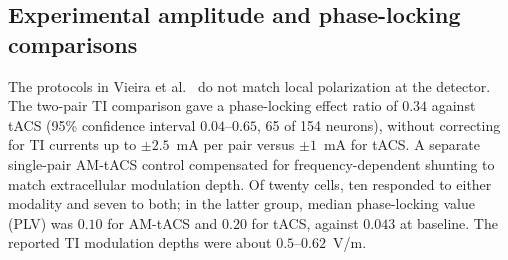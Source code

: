 \subsection{Experimental amplitude and phase-locking comparisons}\label{supp:vieira}
The protocols in Vieira et al.\ \cite{vieira2024} do not match local polarization at the detector.
The two-pair TI comparison gave a phase-locking effect ratio of $0.34$ against
tACS (95\% confidence interval $0.04$--$0.65$, 65 of 154 neurons), without
correcting for TI currents up to $\pm2.5$~mA per pair versus $\pm1$~mA for tACS.
A separate single-pair AM-tACS control compensated for frequency-dependent
shunting to match extracellular modulation depth. Of twenty cells, ten responded
to either modality and seven to both; in the latter group, median phase-locking
value (PLV) was $0.10$ for AM-tACS and $0.20$ for tACS, against $0.043$ at baseline.
The reported TI modulation depths were about $0.5$--$0.62$~V/m.
